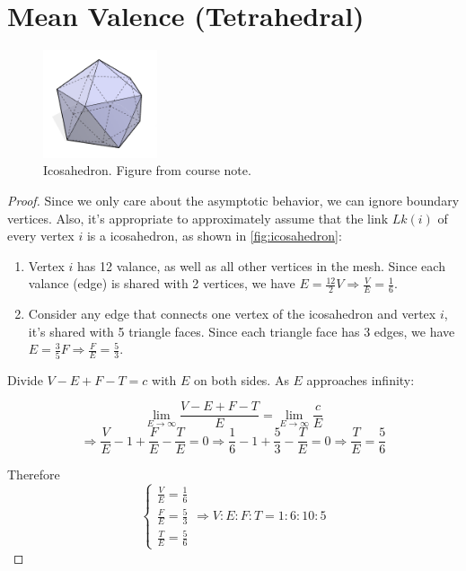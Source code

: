 \section{Mean Valence (Tetrahedral)}
\begin{figure}[h]
    \centering
    \includegraphics[width=0.3\textwidth]{figures/A0/icosahedron.png}
    \caption{Icosahedron. Figure from course note.}
    \label{fig:icosahedron}
\end{figure}
\begin{proof}
    Since we only care about the asymptotic behavior, we can ignore boundary vertices. Also, it's appropriate to approximately assume that the link $Lk(i)$ of every vertex $i$ is a icosahedron, as shown in \autoref{fig:icosahedron}:

    \begin{enumerate}
        \item Vertex $i$ has 12 valance, as well as all other vertices in the mesh. Since each valance (edge) is shared with 2 vertices, we have $E = \frac{12}{2} V \Rightarrow \frac{V}{E} = \frac{1}{6}$.
        \item Consider any edge that connects one vertex of the icosahedron and vertex $i$, it's shared with 5 triangle faces. Since each triangle face has 3 edges, we have $E = \frac{3}{5} F \Rightarrow \frac{F}{E} = \frac{5}{3}$.
    \end{enumerate}
    
    Divide $V - E + F - T = c$ with $E$ on both sides. As $E$ approaches infinity:

    \begin{equation}
        \lim_{E \rightarrow \infty} \frac{V - E + F - T}{E} = \lim_{E \rightarrow \infty} \frac{c}{E}
    \end{equation}
    \begin{equation}
        \Rightarrow \frac{V}{E} - 1 + \frac{F}{E} - \frac{T}{E} = 0
        \Rightarrow \frac{1}{6} - 1 + \frac{5}{3} - \frac{T}{E} = 0
        \Rightarrow \frac{T}{E} = \frac{5}{6}
    \end{equation}

    Therefore
    \begin{equation}
        \begin{cases}
            \frac{V}{E} = \frac{1}{6}\\
            \frac{F}{E} = \frac{5}{3}\\
            \frac{T}{E} = \frac{5}{6}
        \end{cases}
        \Rightarrow V:E:F:T = 1:6:10:5
    \end{equation}
\end{proof}

